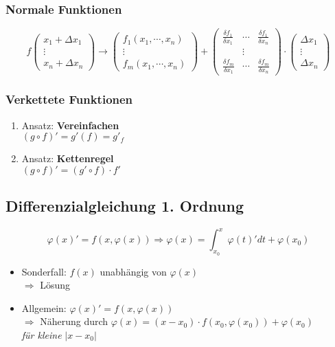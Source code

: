\subsubsection{Normale Funktionen}
\begin{displaymath}
	f
	\begin{pmatrix}
		x_1 + \Delta x_1 \\
		\vdots \\
		x_n + \Delta x_n
	\end{pmatrix}
	\rightarrow
	\begin{pmatrix}
		f_1(x_1,\cdots , x_n) \\
		\vdots \\
		f_m(x_1,\cdots , x_n)
	\end{pmatrix}
	+
	\begin{pmatrix}
		\frac{\delta f_1}{\delta x_1} & \cdots & \frac{\delta f_1}{\delta x_n} \\
		& \vdots & \\
		\frac{\delta f_m}{\delta x_1} & \cdots & \frac{\delta f_m}{\delta x_n}
	\end{pmatrix}
	\cdot
	\begin{pmatrix}
		\Delta x_1 \\
		\vdots \\
		\Delta x_n
	\end{pmatrix}
\end{displaymath}

\subsubsection{Verkettete Funktionen}
\begin{enumerate}
    \item Ansatz: \textbf{Vereinfachen} \\
    $(g \circ f)' = g'(f) = g'_f$

    \item Ansatz: \textbf{Kettenregel} \\
    $(g \circ f)' = (g' \circ f) \cdot f'$
\end{enumerate}

\subsection{Differenzialgleichung 1. Ordnung}
\begin{equation*}
    \varphi(x)' = f(x, \varphi(x)) \Rightarrow \varphi(x) = \int_{x_0}^x \varphi(t)' dt + \varphi(x_0)
\end{equation*}
\begin{itemize}
    \item Sonderfall: $f(x)$ unabhängig von  $\varphi(x)$ \\
    $\Rightarrow$ Lösung

    \item Allgemein: $\varphi(x)' = f(x, \varphi(x))$ \\
    $\Rightarrow$ Näherung durch $\varphi(x) = (x - x_0) \cdot f(x_0, \varphi(x_0)) + \varphi(x_0)$ \\
    \textit{für kleine} $|x - x_0|$
\end{itemize}

